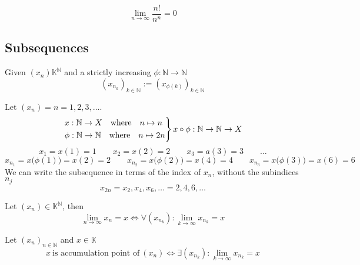 \begin{proposition}
   \[\lim_{n \to \infty} \frac{n!}{n^n} = 0\]
\end{proposition}

\subsection{Subsequences}
\begin{definition}[Subsequence]
   Given \((x_n) \mathbb{K}^\mathbb{N}\) and a strictly increasing \(\phi: \mathbb{N} \to \mathbb{N}\)
   \[(x_{n_k})_{k \in \mathbb{N}} := (x_{\phi(k)})_{k \in \mathbb{N}}\]
\end{definition}
\begin{example}
   Let \((x_n) = n = 1, 2, 3, \ldots\).
   \[\begin{drcases}
         x: \mathbb{N} \to X \quad\text{where}\quad n \mapsto n \\
         \phi: \mathbb{N} \to \mathbb{N} \quad\text{where}\quad n \mapsto 2n
   \end{drcases} x \circ \phi: \mathbb{N} \to \mathbb{N} \to X\]
   \[x_1 = x(1) = 1 \qquad x_2 = x(2) = 2 \qquad x_3 = a(3) = 3 \qquad \ldots\]
   \[x_{n_1} = x\big(\phi(1)\big) = x(2) = 2 \qquad x_{n_2} = x\big(\phi(2)\big) = x(4) = 4 \qquad x_{n_3} = x\big(\phi(3)\big) = x(6) = 6\]
   We can write the subsequence in terms of the index of \(x_n\), without the subindices \(n_j\)
   \[x_{2n} = x_2, x_4, x_6, \ldots = 2, 4, 6, \ldots\]
\end{example}

\begin{theorem}\label{thm:all_subseq_conv}
   Let \((x_n) \in \mathbb{K}^\mathbb{N}\), then
   \[\lim_{n \to \infty} x_n = x \iff \forall (x_{n_k}): \lim_{k \to \infty} x_{n_k} = x\]
\end{theorem}

\begin{theorem}\label{thm:cp_iff_subseq}
   Let \((x_n)_{n \in \mathbb{N}}\) and \(x \in \mathbb{K}\)
   \[x~\text{is accumulation point of}~(x_n) \iff \exists (x_{n_k}): \lim_{k \to \infty} x_{n_k} = x\]
\end{theorem}

